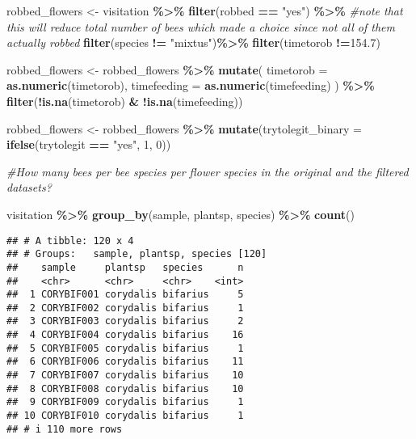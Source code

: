 \documentclass[
]{article}
\newenvironment{Shaded}{\begin{snugshade}}{\end{snugshade}}
\newcommand{\AttributeTok}[1]{\textcolor[rgb]{0.13,0.29,0.53}{#1}}
\newcommand{\CommentTok}[1]{\textcolor[rgb]{0.56,0.35,0.01}{\textit{#1}}}
\newcommand{\DecValTok}[1]{\textcolor[rgb]{0.00,0.00,0.81}{#1}}
\newcommand{\FloatTok}[1]{\textcolor[rgb]{0.00,0.00,0.81}{#1}}
\newcommand{\FunctionTok}[1]{\textcolor[rgb]{0.13,0.29,0.53}{\textbf{#1}}}
\newcommand{\NormalTok}[1]{#1}
\newcommand{\OtherTok}[1]{\textcolor[rgb]{0.56,0.35,0.01}{#1}}
\newcommand{\SpecialCharTok}[1]{\textcolor[rgb]{0.81,0.36,0.00}{\textbf{#1}}}
\newcommand{\StringTok}[1]{\textcolor[rgb]{0.31,0.60,0.02}{#1}}
\begin{document}
\begin{Shaded}
\begin{Highlighting}[]
\NormalTok{robbed\_flowers }\OtherTok{\textless{}{-}}\NormalTok{ visitation }\SpecialCharTok{\%\textgreater{}\%}
  \FunctionTok{filter}\NormalTok{(robbed }\SpecialCharTok{==} \StringTok{"yes"}\NormalTok{) }\SpecialCharTok{\%\textgreater{}\%} \CommentTok{\#note that this will reduce total number of bees which made a choice since not all of them actually \textquotesingle{}robbed\textquotesingle{}}
  \FunctionTok{filter}\NormalTok{(species }\SpecialCharTok{!=} \StringTok{"mixtus"}\NormalTok{)}\SpecialCharTok{\%\textgreater{}\%}
  \FunctionTok{filter}\NormalTok{(timetorob }\SpecialCharTok{!=}\FloatTok{154.7}\NormalTok{) }

\NormalTok{robbed\_flowers }\OtherTok{\textless{}{-}}\NormalTok{ robbed\_flowers }\SpecialCharTok{\%\textgreater{}\%}
  \FunctionTok{mutate}\NormalTok{(}
    \AttributeTok{timetorob =} \FunctionTok{as.numeric}\NormalTok{(timetorob),}
    \AttributeTok{timefeeding =} \FunctionTok{as.numeric}\NormalTok{(timefeeding)}
\NormalTok{  ) }\SpecialCharTok{\%\textgreater{}\%}
  \FunctionTok{filter}\NormalTok{(}\SpecialCharTok{!}\FunctionTok{is.na}\NormalTok{(timetorob) }\SpecialCharTok{\&} \SpecialCharTok{!}\FunctionTok{is.na}\NormalTok{(timefeeding))}

\NormalTok{robbed\_flowers }\OtherTok{\textless{}{-}}\NormalTok{ robbed\_flowers }\SpecialCharTok{\%\textgreater{}\%}
  \FunctionTok{mutate}\NormalTok{(}\AttributeTok{trytolegit\_binary =} \FunctionTok{ifelse}\NormalTok{(trytolegit }\SpecialCharTok{==} \StringTok{"yes"}\NormalTok{, }\DecValTok{1}\NormalTok{, }\DecValTok{0}\NormalTok{))}

\CommentTok{\#How many bees per bee species per flower species in the original and the filtered datasets?}

\NormalTok{visitation }\SpecialCharTok{\%\textgreater{}\%} \FunctionTok{group\_by}\NormalTok{(sample, plantsp, species) }\SpecialCharTok{\%\textgreater{}\%} \FunctionTok{count}\NormalTok{()}
\end{Highlighting}
\end{Shaded}

\begin{verbatim}
## # A tibble: 120 x 4
## # Groups:   sample, plantsp, species [120]
##    sample     plantsp   species      n
##    <chr>      <chr>     <chr>    <int>
##  1 CORYBIF001 corydalis bifarius     5
##  2 CORYBIF002 corydalis bifarius     1
##  3 CORYBIF003 corydalis bifarius     2
##  4 CORYBIF004 corydalis bifarius    16
##  5 CORYBIF005 corydalis bifarius     1
##  6 CORYBIF006 corydalis bifarius    11
##  7 CORYBIF007 corydalis bifarius    10
##  8 CORYBIF008 corydalis bifarius    10
##  9 CORYBIF009 corydalis bifarius     1
## 10 CORYBIF010 corydalis bifarius     1
## # i 110 more rows
\end{verbatim}
\end{document}
